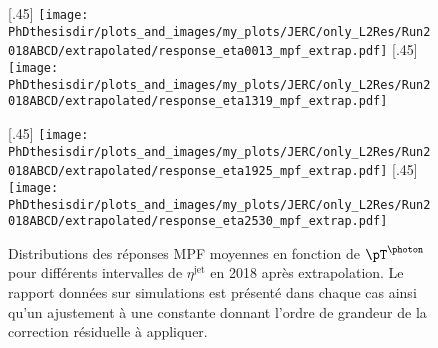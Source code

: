 \begin{figure}[p]
\centering
{}[.45\textwidth]
{\texttt{[image: \\PhDthesisdir/plots\_and\_images/my\_plots/JERC/only\_L2Res/Run2018ABCD/extrapolated/response\_eta0013\_mpf\_extrap.pdf]}}
\hfill
{}[.45\textwidth]
{\texttt{[image: \\PhDthesisdir/plots\_and\_images/my\_plots/JERC/only\_L2Res/Run2018ABCD/extrapolated/response\_eta1319\_mpf\_extrap.pdf]}}

\vfill

[.45\textwidth]
{\texttt{[image: \\PhDthesisdir/plots\_and\_images/my\_plots/JERC/only\_L2Res/Run2018ABCD/extrapolated/response\_eta1925\_mpf\_extrap.pdf]}}
\hfill
{}[.45\textwidth]
{\texttt{[image: \\PhDthesisdir/plots\_and\_images/my\_plots/JERC/only\_L2Res/Run2018ABCD/extrapolated/response\_eta2530\_mpf\_extrap.pdf]}}

\caption[Réponses MPF en 2018 apr\`es extrapolation.]{Distributions des réponses MPF moyennes en fonction de $\pT^{\text{\photon}}$ pour différents intervalles de $\eta^\text{jet}$ en 2018 apr\`es extrapolation. Le rapport données sur simulations est présenté dans chaque cas ainsi qu'un ajustement à une constante donnant l'ordre de grandeur de la correction résiduelle à appliquer.}
\label{fig-responses_MPF_extrapolated_2018ABCD}
\end{figure}